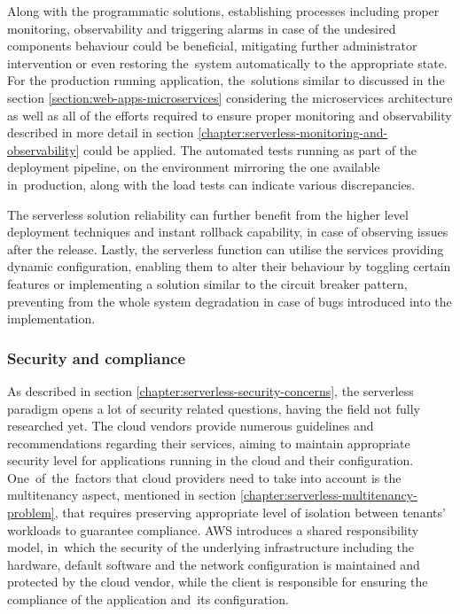 Along with the programmatic solutions, establishing processes including proper monitoring, observability and triggering alarms in case of the undesired components behaviour could be beneficial, mitigating further administrator intervention or even restoring the~system automatically to the appropriate state.
For the production running application, the~solutions similar to discussed in the section \ref{section:web-apps-microservices} considering the microservices architecture as well as all of the efforts required to ensure proper monitoring and observability described in more detail in section \ref{chapter:serverless-monitoring-and-observability} could be applied.
The automated tests running as part of the deployment pipeline, on the environment mirroring the one available in~production, along with the load tests can indicate various discrepancies.

The serverless solution reliability can further benefit from the higher level deployment techniques and instant rollback capability, in case of observing issues after the release. Lastly, the serverless function can utilise the services providing dynamic configuration, enabling them to alter their behaviour by toggling certain features or implementing a solution similar to the circuit breaker pattern, preventing from the whole system degradation in case of bugs introduced into the implementation.

\subsubsection{Security and compliance} \label{chapter:serverless-suitability-security-and-compliance}

As described in section \ref{chapter:serverless-security-concerns}, the serverless paradigm opens a lot of security related questions, having the field not fully researched yet. The cloud vendors provide numerous guidelines and recommendations regarding their services, aiming to maintain appropriate security level for applications running in the cloud and their configuration.
One~of~the~factors that cloud providers need to take into account is the multitenancy aspect, mentioned in section \ref{chapter:serverless-multitenancy-problem}, that requires preserving appropriate level of isolation between tenants' workloads to guarantee compliance.
AWS introduces a shared responsibility model, in~which the security of the underlying infrastructure including the hardware, default software and the network configuration is maintained and protected by the cloud vendor, while the client is responsible for ensuring the compliance of the application and~its configuration.

